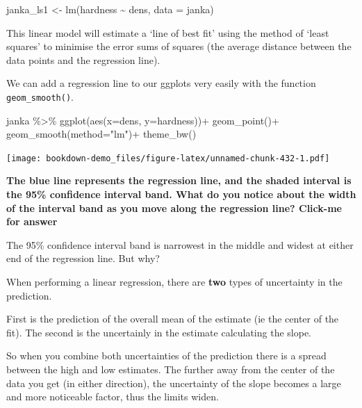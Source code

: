 \documentclass[
]{book}
\newenvironment{Shaded}{\begin{snugshade}}{\end{snugshade}}
\newcommand{\AttributeTok}[1]{\textcolor[rgb]{0.77,0.63,0.00}{#1}}
\newcommand{\FunctionTok}[1]{\textcolor[rgb]{0.00,0.00,0.00}{#1}}
\newcommand{\NormalTok}[1]{#1}
\newcommand{\OtherTok}[1]{\textcolor[rgb]{0.56,0.35,0.01}{#1}}
\newcommand{\SpecialCharTok}[1]{\textcolor[rgb]{0.00,0.00,0.00}{#1}}
\newcommand{\StringTok}[1]{\textcolor[rgb]{0.31,0.60,0.02}{#1}}
\begin{document}
\begin{Shaded}
\begin{Highlighting}[]
\NormalTok{janka\_ls1 }\OtherTok{\textless{}{-}} \FunctionTok{lm}\NormalTok{(hardness }\SpecialCharTok{\textasciitilde{}}\NormalTok{ dens, }\AttributeTok{data =}\NormalTok{ janka) }
\end{Highlighting}
\end{Shaded}

This linear model will estimate a `line of best fit' using the method of `least squares' to minimise the error sums of squares (the average distance between the data points and the regression line).

We can add a regression line to our ggplots very easily with the function \texttt{geom\_smooth()}.

\begin{Shaded}
\begin{Highlighting}[]
\NormalTok{janka }\SpecialCharTok{\%\textgreater{}\%} 
  \FunctionTok{ggplot}\NormalTok{(}\FunctionTok{aes}\NormalTok{(}\AttributeTok{x=}\NormalTok{dens, }\AttributeTok{y=}\NormalTok{hardness))}\SpecialCharTok{+}
  \FunctionTok{geom\_point}\NormalTok{()}\SpecialCharTok{+}
  \FunctionTok{geom\_smooth}\NormalTok{(}\AttributeTok{method=}\StringTok{"lm"}\NormalTok{)}\SpecialCharTok{+}
  \FunctionTok{theme\_bw}\NormalTok{()}
\end{Highlighting}
\end{Shaded}

\texttt{[image: bookdown-demo\_files/figure-latex/unnamed-chunk-432-1.pdf]}

\textbf{The blue line represents the regression line, and the shaded interval is the 95\% confidence interval band. What do you notice about the width of the interval band as you move along the regression line? Click-me for answer}

The 95\% confidence interval band is narrowest in the middle and widest at either end of the regression line. But why?

When performing a linear regression, there are \textbf{two} types of uncertainty in the prediction.

First is the prediction of the overall mean of the estimate (ie the center of the fit). The second is the uncertainly in the estimate calculating the slope.

So when you combine both uncertainties of the prediction there is a spread between the high and low estimates. The further away from the center of the data you get (in either direction), the uncertainty of the slope becomes a large and more noticeable factor, thus the limits widen.
\end{document}
